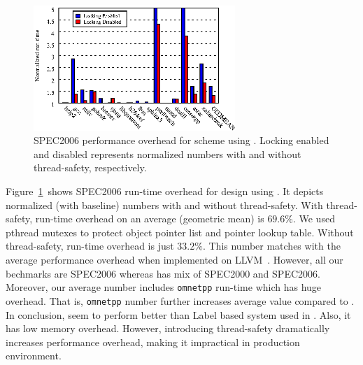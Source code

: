 \begin{figure}[t]
\center
  \includegraphics[width=3in]{plots/metalloc_freesentry.eps}
  \caption{SPEC2006 performance overhead for \freesentry{} scheme using \metalloc{}. Locking enabled and disabled represents normalized numbers with and without thread-safety, respectively.}
  \label{fig:metalloc-freesentry-graph}
  \vspace{-1em}
\end{figure} 

Figure~\ref{fig:metalloc-freesentry-graph}\ shows SPEC2006 run-time overhead for \freesentry{} design using \metalloc{}. It depicts normalized (with baseline) numbers with and without thread-safety. With thread-safety, run-time overhead on an average (geometric mean) is $69.6\%$. We used pthread mutexes to protect object pointer list and pointer lookup table. Without thread-safety, run-time overhead is just $33.2\%$. This number matches with the average \freesentry{} performance overhead when implemented on LLVM~\cite{freesentrypppt}. However, all our bechmarks are SPEC2006 whereas \freesentry{} has mix of SPEC2000 and SPEC2006. Moreover, our average number includes \texttt{omnetpp} run-time which has huge overhead. That is, \texttt{omnetpp} number further increases average value compared to \freesentry{}. In conclusion, \metalloc{} seem to perform better than Label based system used in \freesentry{}. Also, it has low memory overhead. However, introducing thread-safety dramatically increases performance overhead, making it impractical in production environment.


